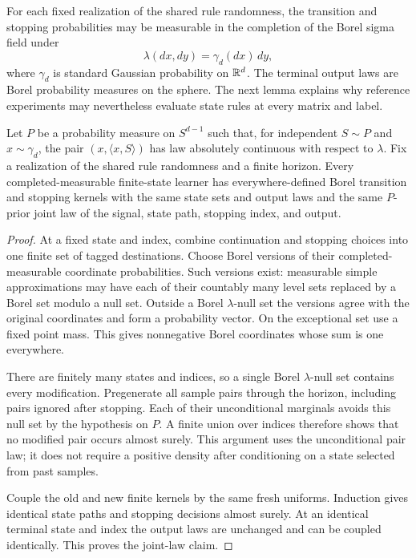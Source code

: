 For each fixed realization of the shared rule randomness, the
transition and stopping probabilities may be measurable in the
completion of the Borel sigma field under
\[
 \lambda(dx,dy)=\gamma_d(dx)\,dy,
\]
where \(\gamma_d\) is standard Gaussian probability on \(\mathbb R^d\).
The terminal output laws are Borel probability measures on the sphere.
The next lemma explains why reference experiments may nevertheless
evaluate state rules at every matrix and label.

\begin{lemma}
\label{l:borel}
Let \(P\) be a probability measure on \(S^{d-1}\) such that, for
independent \(S\sim P\) and \(x\sim\gamma_d\), the pair
\((x,\langle x,S\rangle)\) has law absolutely continuous with respect
to \(\lambda\). Fix a realization of the shared rule randomness and
a finite horizon. Every completed-measurable finite-state learner has
everywhere-defined Borel transition and stopping kernels with the
same state sets and output laws and the same \(P\)-prior joint law of
the signal, state path, stopping index, and output.
\end{lemma}

\begin{proof}
At a fixed state and index, combine continuation and stopping choices
into one finite set of tagged destinations. Choose Borel versions of
their completed-measurable coordinate probabilities. Such versions
exist: measurable simple approximations may have each of their
countably many level sets replaced by a Borel set modulo a null set.
Outside a Borel \(\lambda\)-null set the versions agree with the
original coordinates and form a probability vector. On the exceptional
set use a fixed point mass. This gives nonnegative Borel coordinates
whose sum is one everywhere.

There are finitely many states and indices, so a single Borel
\(\lambda\)-null set contains every modification. Pregenerate all
sample pairs through the horizon, including pairs ignored after
stopping. Each of their unconditional marginals avoids this null set
by the hypothesis on \(P\). A finite union over indices therefore
shows that no modified pair occurs almost surely. This argument uses
the unconditional pair law; it does not require a positive density
after conditioning on a state selected from past samples.

Couple the old and new finite kernels by the same fresh uniforms.
Induction gives identical state paths and stopping decisions almost
surely. At an identical terminal state and index the output laws are
unchanged and can be coupled identically. This proves the joint-law
claim.
\end{proof}

